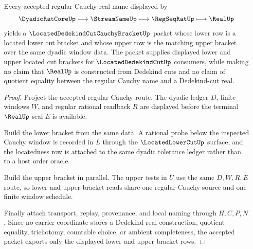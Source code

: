 \begin{theorem}
\label{thm:located-dedekind-cut-cauchy-bracket}
Every accepted regular Cauchy real name displayed by
$$
\DyadicRatCoreUp \longmapsto \StreamNameUp \longmapsto \RegSeqRatUp \longmapsto \RealUp
$$
yields a $\LocatedDedekindCutCauchyBracketUp$ packet whose lower row is a located lower cut bracket and whose upper row is the matching upper bracket over the same dyadic window data. The packet supplies displayed lower and upper located cut brackets for $\LocatedDedekindCutUp$ consumers, while making no claim that $\RealUp$ is constructed from Dedekind cuts and no claim of quotient equality between the regular Cauchy name and a Dedekind-cut real.
\end{theorem}
\begin{proof}
Project the accepted regular Cauchy route. The dyadic ledger $D$, finite windows $W$, and regular rational readback $R$ are displayed before the terminal $\RealUp$ seal $E$ is available.

Build the lower bracket from the same data. A rational probe below the inspected Cauchy window is recorded in $L$ through the $\LocatedLowerCutUp$ surface, and the locatedness row is attached to the same dyadic tolerance ledger rather than to a host order oracle.

Build the upper bracket in parallel. The upper tests in $U$ use the same $D,W,R,E$ route, so lower and upper bracket reads share one regular Cauchy source and one finite window schedule.

Finally attach transport, replay, provenance, and local naming through $H,C,P,N$. Since no carrier coordinate stores a Dedekind-real construction, quotient equality, trichotomy, countable choice, or ambient completeness, the accepted packet exports only the displayed lower and upper bracket rows.
\end{proof}

